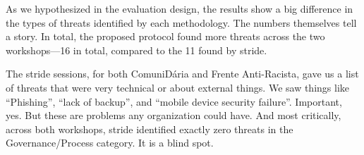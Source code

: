 \begin{table}[!htbp]
    \caption{Quantitative Comparison of Threat Modeling Methodologies}
    \label{tab:evaluation-results}
    \scriptsize
\end{table}

As we hypothesized in the evaluation design, the results show a big difference
in the types of threats identified by each methodology. The numbers themselves
tell a story. In total, the proposed protocol found more threats across the two
workshops—16 in total, compared to the 11 found by \gls{stride}.

The \gls{stride} sessions, for both ComuniDária and Frente Anti-Racista, gave us a
list of threats that were very technical or about external things. We saw things
like “Phishing”, “lack of backup”, and “mobile device security failure”.
Important, yes. But these are problems any organization could have. And most
critically, across both workshops, \gls{stride} identified exactly zero threats in the
Governance/Process category. It is a blind spot.

